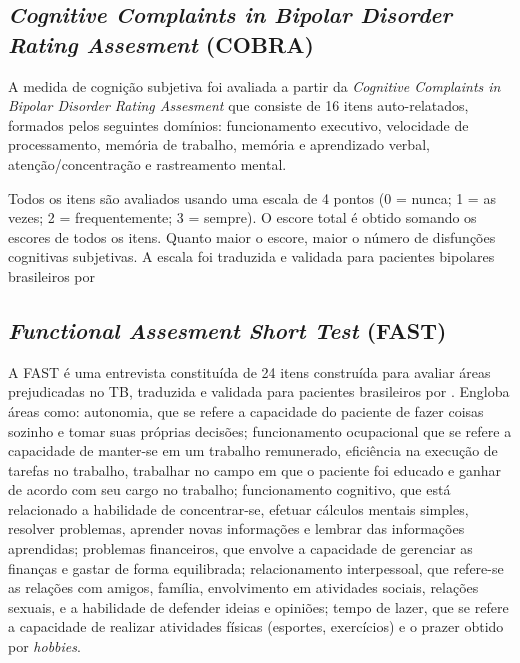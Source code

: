 \documentclass[chapter=TITLE,oneside,12pt,a4paper,english,brazil]{abntex2} %
\begin{document}
    \subsection{\textit{Cognitive Complaints in Bipolar Disorder Rating Assesment} (COBRA)}\label{sec:cobra}

    A medida de cognição subjetiva foi avaliada a partir da
    \textit{Cognitive Complaints in Bipolar Disorder Rating Assesment}
    que consiste de 16 itens auto-relatados, formados pelos seguintes domínios:
    funcionamento executivo, velocidade de processamento, memória de trabalho,
    memória e aprendizado verbal, atenção/concentração e rastreamento mental.

    Todos os itens são avaliados usando uma escala de 4 pontos
    (0 = nunca; 1 = as vezes; 2 = frequentemente; 3 = sempre).
    O escore total é obtido somando os escores de todos os itens.
    Quanto maior o escore, maior o número de disfunções cognitivas subjetivas.
    A escala foi traduzida e validada para pacientes bipolares brasileiros
    por \textcite{lima_validity_2018}

    \subsection{\textit{Functional Assesment Short Test} (FAST)}\label{sec:fast}

    A FAST é uma entrevista constituída de 24 itens construída para avaliar
    áreas prejudicadas no TB, traduzida e validada para pacientes brasileiros
    por \textcite{cacilhas_validity_2009}.
    Engloba áreas como: autonomia, que se refere a capacidade do paciente de
    fazer coisas sozinho e tomar suas próprias decisões; funcionamento
    ocupacional que se refere a capacidade de manter-se em um trabalho
    remunerado, eficiência na execução de tarefas no trabalho, trabalhar
    no campo em que o paciente foi educado e ganhar de acordo com seu cargo
    no trabalho; funcionamento cognitivo, que está relacionado a habilidade
    de concentrar-se, efetuar cálculos mentais simples, resolver problemas,
    aprender novas informações e lembrar das informações aprendidas; problemas
    financeiros, que envolve a capacidade de gerenciar as finanças e gastar de
    forma equilibrada; relacionamento interpessoal, que refere-se as relações
    com amigos, família, envolvimento em atividades sociais, relações sexuais,
    e a habilidade de defender ideias e opiniões; tempo de lazer, que se refere
    a capacidade de realizar atividades físicas (esportes, exercícios) e o prazer
    obtido por \textit{hobbies}.
\end{document}
